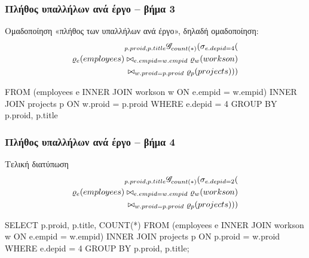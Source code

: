 \begin{frame}
\frametitle{Πλήθος υπαλλήλων ανά έργο -- βήμα 3}
\begin{minipage}{\wE}
\vspace{-0.5cm}
\begin{block}{\small Ομαδοποίηση}
  «πλήθος των υπαλλήλων ανά έργο», δηλαδή {\crr ομαδοποίηση}:\\
\[
\begin{split}
  {}_{p.proid, p.title} \mathscr{G}_{count(*)}
    (
      \sigma_{e.depid=4}
      (                           \\
        \varrho_{e} (employees) \bowtie_{e.empid=w.empid} \varrho_{w} (workson) \\
                                \bowtie_{w.proid=p.proid} \varrho_{p} (projects)
      )
    )
\end{split}
\]
\pause
\en
\begin{SQL}
    FROM (employees e INNER JOIN workson w
                         ON e.empid = w.empid)
                      INNER JOIN projects p
                         ON w.proid = p.proid
   WHERE e.depid = 4
GROUP BY p.proid, p.title
\end{SQL}
\el
\end{block}
\end{minipage}
\end{frame}


\begin{frame}
\frametitle{Πλήθος υπαλλήλων ανά έργο -- βήμα 4}
\begin{minipage}{\wE}
\vspace{-0.5cm}
\begin{block}{\small Τελική διατύπωση}
\[
\begin{split}
      {}_{p.proid, p.title} \mathscr{G}_{count(*)}
      (
        \sigma_{e.depid=2}
        (                           \\
          \varrho_{e} (employees) \bowtie_{e.empid=w.empid} \varrho_{w} (workson) \\
                                  \bowtie_{w.proid=p.proid} \varrho_{p} (projects)
        )
      )
\end{split}
\]
\pause
\en
\begin{SQL}
  SELECT p.proid, p.title, COUNT(*)
    FROM (employees e INNER JOIN workson  w
                         ON e.empid = w.empid)
                      INNER JOIN projects p
                         ON p.proid = w.proid
   WHERE e.depid = 4
GROUP BY p.proid, p.title;
\end{SQL}
\el
\end{block}
\end{minipage}
\end{frame}


